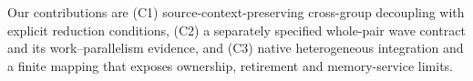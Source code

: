 Our contributions are (C1) source-context-preserving cross-group decoupling with explicit reduction conditions, (C2) a separately specified whole-pair wave contract and its work--parallelism evidence, and (C3) native heterogeneous integration and a finite mapping that exposes ownership, retirement and memory-service limits.
